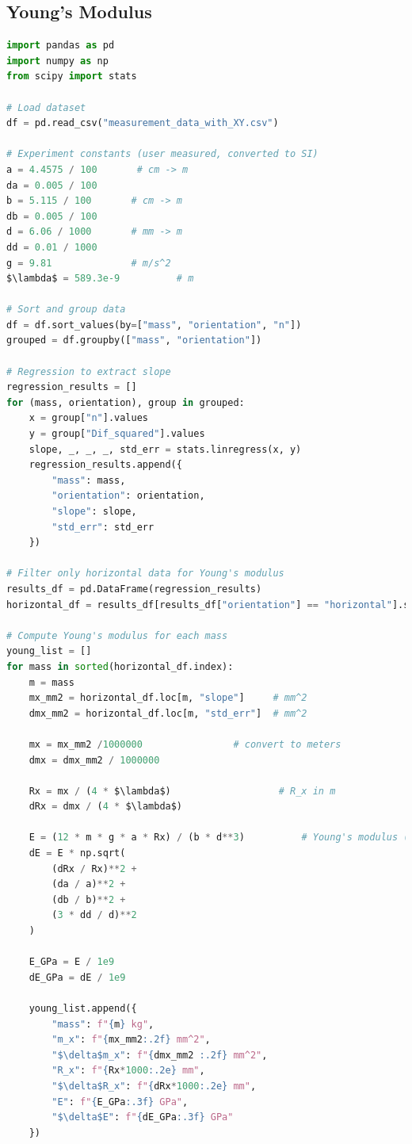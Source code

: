 \documentclass[a4paper,11pt]{article}
\begin{document}
\subsection{Young's Modulus}
\begin{lstlisting}[language=Python]
import pandas as pd
import numpy as np
from scipy import stats

# Load dataset
df = pd.read_csv("measurement_data_with_XY.csv")

# Experiment constants (user measured, converted to SI)
a = 4.4575 / 100       # cm -> m
da = 0.005 / 100
b = 5.115 / 100       # cm -> m
db = 0.005 / 100
d = 6.06 / 1000       # mm -> m
dd = 0.01 / 1000
g = 9.81              # m/s^2
$\lambda$ = 589.3e-9          # m

# Sort and group data
df = df.sort_values(by=["mass", "orientation", "n"])
grouped = df.groupby(["mass", "orientation"])

# Regression to extract slope
regression_results = []
for (mass, orientation), group in grouped:
    x = group["n"].values
    y = group["Dif_squared"].values
    slope, _, _, _, std_err = stats.linregress(x, y)
    regression_results.append({
        "mass": mass,
        "orientation": orientation,
        "slope": slope,
        "std_err": std_err
    })

# Filter only horizontal data for Young's modulus
results_df = pd.DataFrame(regression_results)
horizontal_df = results_df[results_df["orientation"] == "horizontal"].set_index("mass")

# Compute Young's modulus for each mass
young_list = []
for mass in sorted(horizontal_df.index):
    m = mass
    mx_mm2 = horizontal_df.loc[m, "slope"]     # mm^2
    dmx_mm2 = horizontal_df.loc[m, "std_err"]  # mm^2
    
    mx = mx_mm2 /1000000                # convert to meters
    dmx = dmx_mm2 / 1000000

    Rx = mx / (4 * $\lambda$)                   # R_x in m
    dRx = dmx / (4 * $\lambda$)

    E = (12 * m * g * a * Rx) / (b * d**3)          # Young's modulus (Pa)
    dE = E * np.sqrt(
        (dRx / Rx)**2 +
        (da / a)**2 +
        (db / b)**2 +
        (3 * dd / d)**2
    )

    E_GPa = E / 1e9
    dE_GPa = dE / 1e9

    young_list.append({
        "mass": f"{m} kg",
        "m_x": f"{mx_mm2:.2f} mm^2",
        "$\delta$m_x": f"{dmx_mm2 :.2f} mm^2",
        "R_x": f"{Rx*1000:.2e} mm",
        "$\delta$R_x": f"{dRx*1000:.2e} mm",
        "E": f"{E_GPa:.3f} GPa",
        "$\delta$E": f"{dE_GPa:.3f} GPa"
    })


\end{lstlisting}
\end{document}
